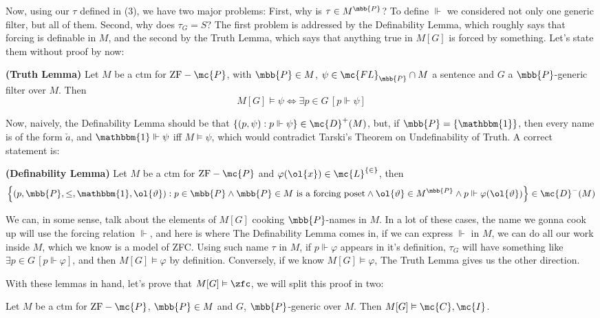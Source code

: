 Now, using our $\tau$ defined in (3), we have two major problems: First, why is $\tau\in M^{\mbb{P}}$? To define $\Vdash$ we considered not only one generic filter, but all of them. Second, why does $\tau_G=S$? The first problem is addressed by the Definability Lemma, which roughly says that forcing is definable in $M$, and the second by the Truth Lemma, which says that anything true in $M[G]$ is forced by something. Let's state them without proof by now:

\begin{lemma}{}{}\label{truth_lemma}
    \textbf{(Truth Lemma)} Let $M$ be a ctm for $\text{ZF}-\mc{P}$, with $\mbb{P}\in M$, $\psi\in\mc{FL}_{\mbb{P}}\cap M$ a sentence and $G$ a $\mbb{P}$-generic filter over $M$. Then
    $$M[G]\vDash\psi\iff\exists p\in G\,[p\Vdash\psi]$$
\end{lemma}

Now, naively, the Definability Lemma should be that $\{(p,\psi):p\Vdash\psi\}\in\mc{D}^+(M)$, but, if $\mbb{P}=\{\mathbbm{1}\}$, then every name is of the form $\check{a}$, and $\mathbbm{1}\Vdash\psi$ iff $M\vDash\psi$, which would contradict Tarski's Theorem on Undefinability of Truth. A correct statement is:

\begin{lemma}{}{}\label{definability_lemma}
    \textbf{(Definability Lemma)} Let $M$ be a ctm for $\text{ZF}-\mc{P}$ and $\varphi(\ol{x})\in\mc{L}^{\{\in\}}$, then
    $$\left\{(p,\mbb{P},\leq,\mathbbm{1},\ol{\vartheta}):p\in\mbb{P}\wedge\mbb{P}\in M\text{ is a forcing poset}\wedge\ol{\vartheta}\in M^{\mbb{P}}\wedge p\Vdash\varphi(\ol{\vartheta})\right\}\in\mc{D}^-(M)$$
\end{lemma}

We can, in some sense, talk about the elements of $M[G]$ cooking $\mbb{P}$-names in $M$. In a lot of these cases, the name we gonna cook up will use the forcing relation $\Vdash$, and here is where The Definability Lemma comes in, if we can express $\Vdash$ in $M$, we can do all our work inside $M$, which we know is a model of ZFC. Using such name $\tau$ in $M$, if $p\Vdash\varphi$ appears in it's definition, $\tau_G$ will have something like $\exists p\in G\,[p\Vdash\varphi]$, and then $M[G]\vDash\varphi$ by definition. Conversely, if we know $M[G]\vDash\varphi$, The Truth Lemma gives us the other direction.

With these lemmas in hand, let's prove that $M[G]\vDash\zfc$, we will split this proof in two:

\begin{lemma}{}{}
    Let $M$ be a ctm for $\text{ZF}-\mc{P}$, $\mbb{P}\in M$ and $G$, $\mbb{P}$-generic over $M$. Then $M[G]\vDash\mc{C},\mc{I}$.
\end{lemma}

